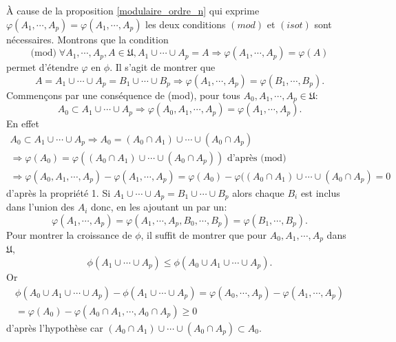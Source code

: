 \begin{demo}
  À cause de la proposition \ref{modulaire_ordre_n} qui exprime $\varphi(A_1, \cdots, A_p) = \varphi(A_1,\cdots,A_p)$ les deux conditions $(mod)$ et $(isot)$ sont nécessaires.\newline
  Montrons que la condition
  \begin{displaymath}
    \text{(mod)} \; \forall A_1, \cdots,A_p,A \in \mathfrak{U}, A_1 \cup \cdots \cup A_p = A \Rightarrow
    \varphi(A_1, \cdots,A_p) = \varphi(A)
  \end{displaymath}
  permet d'étendre $\varphi$ en $\phi$. Il s'agit de montrer que
  \begin{displaymath}
    A = A_1 \cup \cdots \cup A_p = B_1 \cup \cdots \cup B_p \Rightarrow \varphi(A_1, \cdots, A_p) = \varphi(B_1, \cdots, B_p).
  \end{displaymath}
  Commençons par une conséquence de (mod), pour tous $A_0, A_1, \cdots, A_p \in \mathfrak{U}$:
  \begin{displaymath}
    A_0 \subset A_1 \cup \cdots \cup A_p \Rightarrow \varphi(A_0,A_1, \cdots, A_p) = \varphi(A_1, \cdots, A_p).
  \end{displaymath}
  En effet
  \begin{align*}
    A_0 \subset A_1 \cup \cdots \cup A_p \Rightarrow A_0 = (A_0\cap A_1) \cup \cdots \cup (A_0 \cap A_p) \\
      \Rightarrow \varphi(A_0) = \varphi((A_0\cap A_1) \cup \cdots \cup (A_0 \cap A_p)) \text{ d'après (mod)} \\
      \Rightarrow \varphi(A_0,A_1, \cdots, A_p) - \varphi(A_1, \cdots, A_p) = \varphi(A_0) - \varphi((A_0\cap A_1) \cup \cdots \cup (A_0 \cap A_p) = 0
  \end{align*}
  d'après la propriété 1. Si $A_1 \cup \cdots \cup A_p = B_1 \cup \cdots \cup B_p$ alors chaque $B_i$ est inclus dans l'union des $A_i$ donc, en les ajoutant un par un:
  \begin{displaymath}
    \varphi(A_1, \cdots, A_p) = \varphi(A_1, \cdots, A_p, B_0, \cdots, B_p) = \varphi(B_1, \cdots, B_p).
  \end{displaymath}
  Pour montrer la croissance de $\phi$, il suffit de montrer que pour $A_0, A_1, \cdots, A_p$ dans $\mathfrak{U}$,
  \begin{displaymath}
    \phi(A_1\cup \cdots \cup A_p) \leq \phi(A_0 \cup A_1 \cup \cdots \cup A_p).
  \end{displaymath}
  Or
  \begin{align*}
    \phi(A_0 \cup A_1 \cup \cdots \cup A_p) - \phi(A_1\cup \cdots \cup A_p)
    = \varphi(A_0, \cdots, A_p) - \varphi(A_1, \cdots, A_p)\\
    = \varphi(A_0) - \varphi(A_0\cap A_1, \cdots, A_0\cap A_p) \geq 0
  \end{align*}
d'après l'hypothèse car $(A_0 \cap A_1) \cup \cdots \cup (A_0\cap A_p) \subset A_0$.
\end{demo}


